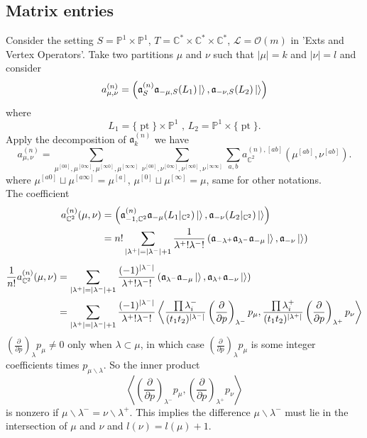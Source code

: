 \documentclass{article}
\renewcommand{\frak}[1]{\mathfrak{#1}}
\newcommand{\cc}[1]{\mathcal{#1}}
\newcommand{\lr}[1]{\left({#1}\right)}
\newcommand{\inprod}[1]{\left<{#1}\right>}
\newcommand{\PP}{\mathbb{P}}
\newcommand{\C}{\mathbb{C}}
\newcommand{\vacuum}{\ket{}}
\DeclareMathOperator{\pt}{pt}
\newcommand{\p}{\partial}
\begin{document}
\subsection{Matrix entries}
Consider the setting $S=\PP^1\times\PP^1$, $T=\C^*\times\C^*\times\C^*$, $\cc{L}=\cc{O}(m)$ in 'Exts and Vertex Operators'. Take two partitions $\mu$ and $\nu$ such that $|\mu|=k$ and $|\nu|=l$ and consider
\[a^{(n)}_{\mu,\nu}=\lr{\frak{a}^{(n)}_{S}\frak{a}_{-\mu,S}(L_1)\vacuum,\frak{a}_{-\nu,S}(L_2)\vacuum}\]where \[L_1 = \{\pt\}\times\PP^1\text{ ,     }L_2=\PP^1\times\{\pt\}.\]Apply the decomposition of $\frak{a}^{(n)}_k$ we have 
\[
a^{(n)}_{\mu,\nu}=\sum_{\mu^{[00]},\mu^{[0\infty]},\mu^{[\infty0]},\mu^{[\infty\infty]}}\sum_{\nu^{[00]},\nu^{[0\infty]},\nu^{[\infty0]},\nu^{[\infty\infty]}}\sum_{a,b}a^{(n),[ab]}_{\C^2}(\mu^{[ab]},\nu^{[ab]}).
\]
where $\mu^{[a0]}\sqcup\mu^{[a\infty]}=\mu^{[a]}$, $\mu^{[0]}\sqcup\mu^{[\infty]}=\mu$, same for other notations.\\

The coefficient 
\[
\begin{aligned}
a^{(n)}_{\C^2}(\mu,\nu) &= \lr{\frak{a}^{(n)}_{-1,\C^2}\frak{a}_{-\mu}(L_1|_{\C^2})\vacuum,\frak{a}_{-\nu}(L_2|_{\C^2})\vacuum}\\
&=n!\sum_{|\lambda^+|=|\lambda^-|+1}\frac{1}{\lambda^+!\lambda^-!}\lr{\frak{a}_{-\lambda^+}\frak{a}_{\lambda^-}\frak{a}_{-\mu}\vacuum,\frak{a}_{-\nu}\vacuum}
\end{aligned}
\]
\[
\begin{aligned}
\frac{1}{n!}a^{(n)}_{\C^2}(\mu,\nu) &= \sum_{|\lambda^+|=|\lambda^-|+1}\frac{(-1)^{|\lambda^-|}}{\lambda^+!\lambda^-!}\lr{\frak{a}_{\lambda^-}\frak{a}_{-\mu}\vacuum,\frak{a}_{\lambda^+}\frak{a}_{-\nu}\vacuum}\\
&=\sum_{|\lambda^+|=|\lambda^-|+1}\frac{(-1)^{|\lambda^-|}}{\lambda^+!\lambda^-!}\inprod{\frac{\prod\lambda^-_i}{(t_1t_2)^{|\lambda^-|}}\lr{\frac{\p}{\p p}}_{\lambda^-}p_\mu,\frac{\prod\lambda^+_i}{(t_1t_2)^{|\lambda^+|}}\lr{\frac{\p}{\p p}}_{\lambda^+}p_\nu}\\
\end{aligned}
\]
$\lr{\frac{\p}{\p p}}_{\lambda}p_{\mu}\ne0 $ only when $\lambda\subset \mu$, in which case $\lr{\frac{\p}{\p p}}_{\lambda}p_{\mu} $ is some integer coefficients times $p_{\mu\backslash\lambda}$. So the inner product \[\inprod{\lr{\frac{\p}{\p p}}_{\lambda^-}p_\mu,\lr{\frac{\p}{\p p}}_{\lambda^+}p_\nu}\] is nonzero if $\mu\backslash\lambda^-=\nu\backslash\lambda^+$. This implies the difference $\mu\backslash\lambda^-$ must lie in the intersection of $\mu$ and $\nu$ and $l(\nu)=l(\mu)+1$. \\
\end{document}
